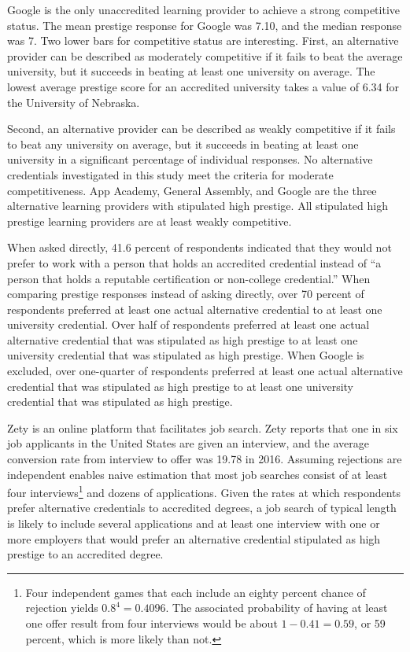 \documentclass[review]{elsarticle}
\begin{document}
Google is the only unaccredited learning provider to achieve a strong competitive status.
The mean prestige response for Google was 7.10, and the median response was 7.
Two lower bars for competitive status are interesting.
First, an alternative provider can be described as moderately competitive if it fails to beat the average university,
but it succeeds in beating at least one university on average.
The lowest average prestige score for an accredited university takes a value of 6.34 for the University of Nebraska.

Second, an alternative provider can be described as weakly competitive if it fails to beat any university on average,
but it succeeds in beating at least one university in a significant percentage of individual responses.
No alternative credentials investigated in this study meet the criteria for moderate competitiveness.
App Academy, General Assembly, and Google are the three alternative learning providers with stipulated high prestige.
All stipulated high prestige learning providers are at least weakly competitive.

When asked directly, 41.6 percent of respondents indicated that they would not prefer to
work with a person that holds an accredited credential instead of ``a person that holds a reputable certification or non-college credential.''
When comparing prestige responses instead of asking directly,
over 70 percent of respondents preferred at least one actual alternative credential to at least one university credential.
Over half of respondents preferred at least one actual alternative credential that was stipulated as high prestige
to at least one university credential that was stipulated as high prestige.
When Google is excluded, over one-quarter of respondents preferred at least one actual alternative credential that was stipulated as high prestige
to at least one university credential that was stipulated as high prestige.

Zety is an online platform that facilitates job search.
Zety reports that one in six job applicants in the United States are given an interview,
and the average conversion rate from interview to offer was 19.78 in 2016\cite{turczynski_2021}.
Assuming rejections are independent enables naive estimation that most job searches consist of at least four interviews\footnote{
    Four independent games that each include an eighty percent chance of rejection yields $0.8^4 = 0.4096$.
    The associated probability of having at least one offer result from four interviews would be about $1 - 0.41 = 0.59$,
    or 59 percent, which is more likely than not.
} and dozens of applications.
Given the rates at which respondents prefer alternative credentials to accredited degrees,
a job search of typical length is likely to include several applications and at least one interview
with one or more employers that would prefer an alternative credential stipulated as high prestige to an accredited degree.
\end{document}
